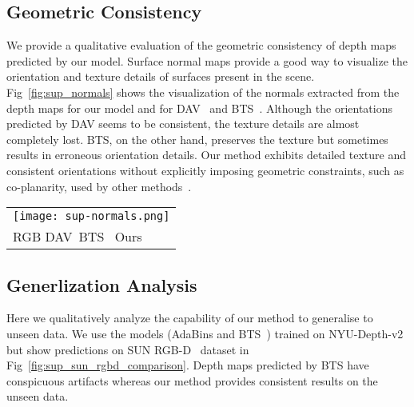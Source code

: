\documentclass[final]{cvpr}
\begin{document}
\subsection{Geometric Consistency}
We provide a qualitative evaluation of the geometric consistency of depth maps predicted by our model. Surface normal maps provide a good way to visualize the orientation and texture details of surfaces present in the scene. Fig~\ref{fig:sup_normals} shows the visualization of the normals extracted from the depth maps for our model and for DAV~\cite{dav_huynh2020guiding} and BTS~\cite{bts_lee2019big}. Although the orientations predicted by DAV seems to be consistent, the texture details are almost completely lost. BTS, on the other hand, preserves the texture but sometimes results in erroneous orientation details. Our method exhibits detailed texture and consistent orientations without explicitly imposing geometric constraints, such as co-planarity, used by other  methods~\cite{dav_huynh2020guiding, bts_lee2019big}.

\begin{figure*}[h]
    \centering
    \begin{tabular}{l}
         \texttt{[image: sup-normals.png]} \\
         \hspace{0.1\linewidth}RGB \hspace{0.2\linewidth}DAV~\cite{dav_huynh2020guiding}\hspace{0.18\linewidth}BTS~\cite{bts_lee2019big} \hspace{0.19\linewidth}Ours\\
    \end{tabular}
    
    \caption{Visualization of surface normals extracted from predicted depth maps.}
    \label{fig:sup_normals}
\end{figure*}



\subsection{Generlization Analysis}
Here we qualitatively analyze the capability of our method to generalise to unseen data. We use the models (AdaBins and BTS~\cite{bts_lee2019big}) trained on NYU-Depth-v2~\cite{Silberman2012} but show predictions on SUN RGB-D~\cite{Song2015_sunrgbd} dataset in Fig~\ref{fig:sup_sun_rgbd_comparison}. Depth maps predicted by BTS have conspicuous artifacts whereas our method provides consistent results on the unseen data.
\end{document}
